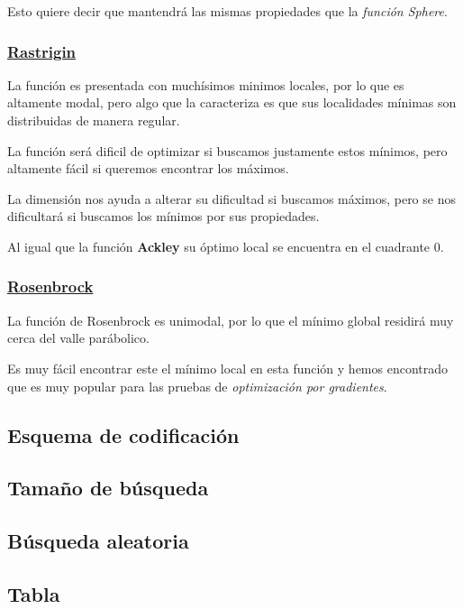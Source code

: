 \documentclass{article}
\begin{document}
Esto quiere decir que mantendrá las mismas propiedades que la \textit{función Sphere}.

\subsubsection*{\href{https://www.sfu.ca/~ssurjano/rastr.html}{Rastrigin}}
La función es presentada con muchísimos minimos locales, por lo que es altamente modal, pero algo que la caracteriza es que sus localidades
mínimas son distribuidas de manera regular.

La función será dificil de optimizar si buscamos justamente estos mínimos, pero altamente fácil si queremos encontrar los máximos.

La dimensión nos ayuda a alterar su dificultad si buscamos máximos, pero se nos dificultará si buscamos los mínimos por sus propiedades.

Al igual que la función \textbf{Ackley} su óptimo local se encuentra en el cuadrante 0.

\subsubsection*{\href{https://www.sfu.ca/~ssurjano/rosen.html}{Rosenbrock}}
La función de Rosenbrock es unimodal, por lo que el mínimo global residirá muy cerca del valle parábolico.

Es muy fácil encontrar este el mínimo local en esta función y hemos encontrado que es muy popular para las pruebas
de \textit{optimización por gradientes}.

\subsection*{Esquema de codificación}

\subsection*{Tamaño de búsqueda}

\subsection*{Búsqueda aleatoria}

\subsection*{Tabla}
\end{document}
